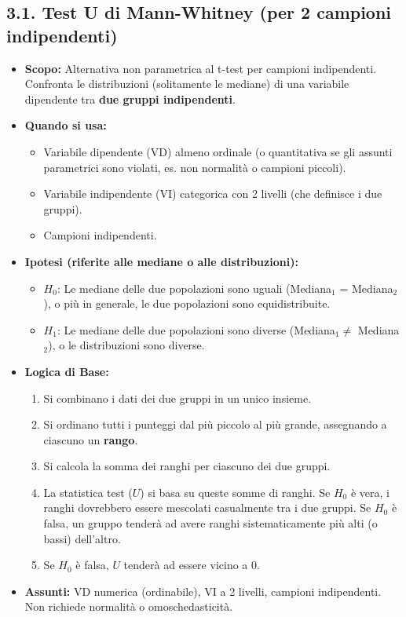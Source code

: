 \documentclass[12pt, a4paper]{article}
\newcommand{\Hnull}{H_0} %
\newcommand{\Halt}{H_1} %
\newcommand{\Umann}{U} %
\begin{document}
\subsection*{3.1. Test U di Mann-Whitney (per 2 campioni indipendenti)}
\begin{itemize}
    \item \textbf{Scopo:} Alternativa non parametrica al t-test per campioni indipendenti. Confronta le distribuzioni (solitamente le mediane) di una variabile dipendente tra \textbf{due gruppi indipendenti}.
    \item \textbf{Quando si usa:}
        \begin{itemize}
            \item Variabile dipendente (VD) almeno ordinale (o quantitativa se gli assunti parametrici sono violati, es. non normalità o campioni piccoli).
            \item Variabile indipendente (VI) categorica con 2 livelli (che definisce i due gruppi).
            \item Campioni indipendenti.
        \end{itemize}
    \item \textbf{Ipotesi (riferite alle mediane o alle distribuzioni):}
        \begin{itemize}
            \item $\Hnull$: Le mediane delle due popolazioni sono uguali (Mediana$_1$ = Mediana$_2$), o più in generale, le due popolazioni sono equidistribuite.
            \item $\Halt$: Le mediane delle due popolazioni sono diverse (Mediana$_1 \neq$ Mediana$_2$), o le distribuzioni sono diverse.
        \end{itemize}
    \item \textbf{Logica di Base:}
        \begin{enumerate}
            \item Si combinano i dati dei due gruppi in un unico insieme.
            \item Si ordinano tutti i punteggi dal più piccolo al più grande, assegnando a ciascuno un \textbf{rango}.
            \item Si calcola la somma dei ranghi per ciascuno dei due gruppi.
            \item La statistica test ($\Umann$) si basa su queste somme di ranghi. Se $\Hnull$ è vera, i ranghi dovrebbero essere mescolati casualmente tra i due gruppi. Se $\Hnull$ è falsa, un gruppo tenderà ad avere ranghi sistematicamente più alti (o bassi) dell'altro.
            \item Se $\Hnull$ è falsa, $\Umann$ tenderà ad essere vicino a 0.
        \end{enumerate}
    \item \textbf{Assunti:} VD numerica (ordinabile), VI a 2 livelli, campioni indipendenti. Non richiede normalità o omoschedasticità.
\end{itemize}
\end{document}
